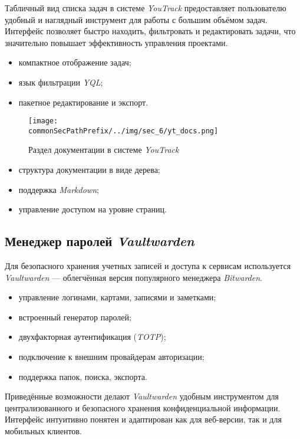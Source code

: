 Табличный вид списка задач в системе \textit{YouTrack} предоставляет пользователю удобный и наглядный инструмент для работы с большим объёмом задач. Интерфейс позволяет быстро находить, фильтровать и редактировать задачи, что значительно повышает эффективность управления проектами.

\begin{itemize}
    \item компактное отображение задач;
    \item язык фильтрации \textit{YQL};
    \item пакетное редактирование и экспорт.
\end{itemize}

\begin{figure}[ht]
    \centering
    \texttt{[image: \\commonSecPathPrefix/../img/sec\_6/yt\_docs.png]}
    \caption{Раздел документации в системе \textit{YouTrack}}
    \label{fig:user_guide:yt_docs}
\end{figure}

\begin{itemize}
    \item структура документации в виде дерева;
    \item поддержка \textit{Markdown};
    \item управление доступом на уровне страниц.
\end{itemize}

\subsection{Менеджер паролей \textit{Vaultwarden}}

Для безопасного хранения учетных записей и доступа к сервисам используется \textit{Vaultwarden}\cite{vaultwarden} — облегчённая версия популярного менеджера \textit{Bitwarden}.

\begin{itemize}
    \item управление логинами, картами, записями и заметками;
    \item встроенный генератор паролей;
    \item двухфакторная аутентификация (\textit{TOTP});
    \item подключение к внешним провайдерам авторизации;
    \item поддержка папок, поиска, экспорта.
\end{itemize}

Приведённые возможности делают \textit{Vaultwarden} удобным инструментом для централизованного и безопасного хранения конфиденциальной информации. Интерфейс интуитивно понятен и адаптирован как для веб-версии, так и для мобильных клиентов.

